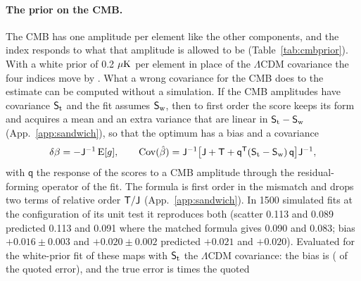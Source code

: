 \begin{table}
\centering
\caption{The fit of Table~\ref{tab:same} under three priors on the CMB amplitudes: the
$\Lambda$CDM covariance, a white prior of 0.2 $\muK$ per element, and a flat prior (). The
index of each region with the profile likelihood, and with flat priors on the synchrotron and dust
amplitudes for the two reference frequencies. $\dagger$: the optimum is at the upper edge of the
allowed range, $-4.6$ to $-1.6$; the other three flat-prior optima of that row are conditional on it.}
\label{tab:cmbprior}
\small
{}
\end{table}

\paragraph{The prior on the CMB.} The CMB has one amplitude per element like the other components,
and the index responds to what that amplitude is allowed to be (Table~\ref{tab:cmbprior}). With a
white prior of 0.2 $\muK$ per element in place of the $\Lambda$CDM covariance the four indices move
by . What a wrong covariance for the CMB does to the estimate can be computed
without a simulation. If the CMB amplitudes have covariance $\mathsf{S}_{\rm t}$ and the fit assumes
$\mathsf{S}_{\rm w}$, then to first order the score keeps its form and acquires a mean and an extra
variance that are linear in $\mathsf{S}_{\rm t} - \mathsf{S}_{\rm w}$ (App.~\ref{app:sandwich}), so
that the optimum has a bias and a covariance
\begin{equation}
  \delta\beta = -\mathsf{J}^{-1}\,\mathrm{E}[g], \qquad
  \mathrm{Cov}(\hat\beta) = \mathsf{J}^{-1}\big[\mathsf{J} + \mathsf{T} + \mathsf{q}^{\mathsf{T}}(\mathsf{S}_{\rm t} - \mathsf{S}_{\rm w})\,\mathsf{q}\big]\mathsf{J}^{-1} ,
  \label{eq:mismatch}
\end{equation}
with $\mathsf{q}$ the response of the scores to a CMB amplitude through the residual-forming
operator of the fit. The formula is first order in the mismatch and drops two terms of relative
order $\mathsf{T}/\mathsf{J}$ (App.~\ref{app:sandwich}). In 1500 simulated fits at the configuration of its unit test
it reproduces both (scatter 0.113 and 0.089 predicted 0.113 and 0.091 where the matched formula gives
0.090 and 0.083; bias $+0.016 \pm 0.003$ and $+0.020 \pm 0.002$ predicted $+0.021$ and $+0.020$). Evaluated for the white-prior fit of these maps
with $\mathsf{S}_{\rm t}$ the $\Lambda$CDM covariance: the bias is 
( of the quoted error), and the true error is  times the quoted
